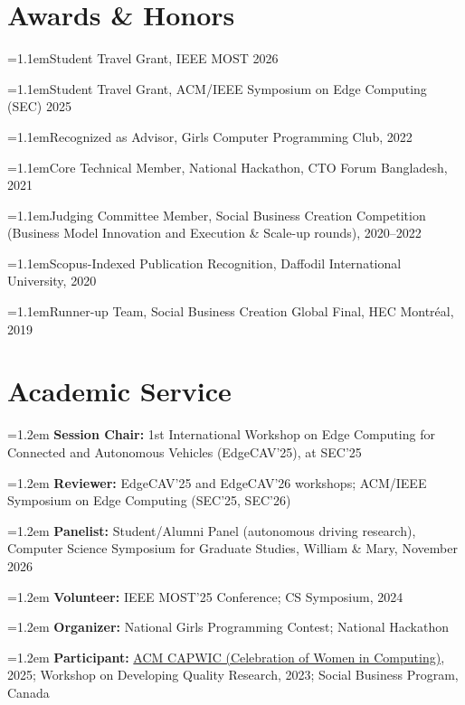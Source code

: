 \documentclass[11pt,letterpaper]{article}
\newcommand{\bulletrow}[1]{%
  \hangindent=1.1em\hangafter=1\makebox[1.1em][l]{\textbullet}#1\par\vspace{1.5pt}}
\newcommand{\labeledrow}[2]{%
  \hangindent=1.2em\hangafter=1 \textbf{#1:} #2\par\vspace{2pt}}
\begin{document}
\section{Awards \& Honors}
\bulletrow{Student Travel Grant, IEEE MOST 2026}
\bulletrow{Student Travel Grant, ACM/IEEE Symposium on Edge Computing (SEC) 2025}
\bulletrow{Recognized as Advisor, Girls Computer Programming Club, 2022}
\bulletrow{Core Technical Member, National Hackathon, CTO Forum Bangladesh, 2021}
\bulletrow{Judging Committee Member, Social Business Creation Competition
  (Business Model Innovation and Execution \& Scale-up rounds), 2020--2022}
\bulletrow{Scopus-Indexed Publication Recognition, Daffodil International
  University, 2020}
\bulletrow{Runner-up Team, Social Business Creation Global Final, HEC
  Montr\'eal, 2019}

\section{Academic Service}
\labeledrow{Session Chair}{1st International Workshop on Edge Computing for
  Connected and Autonomous Vehicles (EdgeCAV'25), at SEC'25}
\labeledrow{Reviewer}{EdgeCAV'25 and EdgeCAV'26 workshops; ACM/IEEE Symposium
  on Edge Computing (SEC'25, SEC'26)}
\labeledrow{Panelist}{Student/Alumni Panel (autonomous driving research),
  Computer Science Symposium for Graduate Studies, William \& Mary,
  November 2026}
\labeledrow{Volunteer}{IEEE MOST'25 Conference; CS Symposium, 2024}
\labeledrow{Organizer}{National Girls Programming Contest; National Hackathon}
\labeledrow{Participant}{\href{https://capwic.org/conferences/2025/}{ACM
  CAPWIC (Celebration of Women in Computing)}, 2025; Workshop
  on Developing Quality Research, 2023; Social Business Program, Canada}
\end{document}
